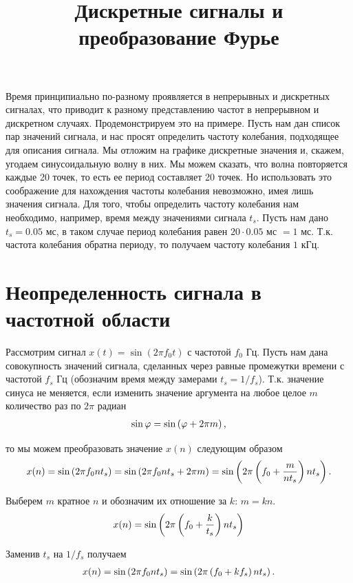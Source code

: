 \documentclass[12pt]{article}
\title{Дискретные сигналы и преобразование Фурье}
\date{}
\newcommand{\lb}{\left(}
\newcommand{\rb}{\right)}
\begin{document}
\maketitle

Время принципиально по-разному проявляется в непрерывных и дискретных сигналах, что приводит к разному представлению частот в непрерывном и дискретном случаях. Продемонстрируем это на примере. Пусть нам дан список пар значений сигнала, и нас просят определить частоту колебания, подходящее для описания сигнала. Мы отложим на графике дискретные значения и, скажем, угодаем синусоидальную волну в них. Мы можем сказать, что волна повторяется каждые 20 точек, то есть ее период составляет 20 точек. Но использовать это соображение для нахождения частоты колебания невозможно, имея лишь значения сигнала. Для того, чтобы определить частоту колебания нам необходимо, например, время между значениями сигнала $t_s$. Пусть нам дано $t_s = 0.05$ мс, в таком случае период колебания равен $20 \cdot 0.05$ мс $= 1$ мс. Т.к. частота колебания обратна периоду, то получаем частоту колебания $1$ кГц. 

\section{Неопределенность сигнала в частотной области}

Рассмотрим сигнал $x(t) = \sin \lb 2 \pi f_0 t \rb$ с частотой $f_0$ Гц. Пусть нам дана совокупность значений сигнала, сделанных через равные промежутки времени с частотой $f_s$ Гц (обозначим время между замерами $t_s = 1/f_s$). Т.к. значение синуса не меняется, если изменить значение аргумента на любое целое $m$ количество раз по $2 \pi$ радиан
\begin{gather}
	\sin \varphi = \sin \lb \varphi + 2 \pi m \rb, \notag
\end{gather}

то мы можем преобразовать значение $x(n)$ следующим образом
\begin{gather}
	x(n) = \sin \lb 2 \pi f_0 n t_s \rb = \sin \lb 2 \pi f_0 n t_s + 2 \pi m \rb = \sin \lb 2 \pi \lb f_0 + \frac{m}{n t_s} \rb n t_s \rb. \notag
\end{gather}

Выберем $m$ кратное $n$ и обозначим их отношение за $k$: $m = kn$.
\begin{gather}
	x(n) = \sin \lb 2 \pi \lb f_0 + \frac{k}{t_s} \rb n t_s \rb \notag 
\end{gather}

Заменив $t_s$ на $1/f_s$ получаем
\begin{gather}
	x(n) = \sin \lb 2 \pi f_0 n t_s \rb = \sin \lb 2 \pi \lb f_0 + k f_s \rb n t_s \rb .\notag
\end{gather}
\end{document}
